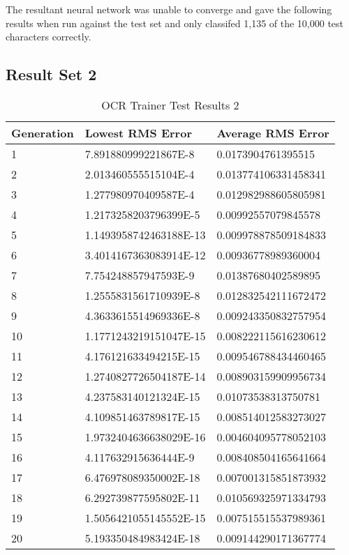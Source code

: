 The resultant neural network was unable to converge and gave the
following results when run against the test set and only classifed
1,135 of the 10,000 test characters correctly.

\subsection{Result Set 2}

\begin{center}
    \begin{longtable}{ | l | l | l |}
      \caption{OCR Trainer Test Results 2} \label{ocr2} \\
    \hline
  Generation & Lowest RMS Error & Average RMS Error \\ \hline
1 &	7.891880999221867E-8 &	0.0173904761395515 \\ \hline
2 &	2.013460555515104E-4 &	0.013774106331458341 \\ \hline
3 &	1.277980970409587E-4 &	0.012982988605805981 \\ \hline
4 &	1.2173258203796399E-5 &	0.00992557079845578 \\ \hline
5 &	1.1493958742463188E-13 &	0.009978878509184833 \\ \hline
6 &	3.4014167363083914E-12 &	0.00936778989360004 \\ \hline
7 &	7.754248857947593E-9 &	0.01387680402589895 \\ \hline
8 &	1.2555831561710939E-8 &	0.012832542111672472 \\ \hline
9 &	4.3633615514969336E-8 &	0.009243350832757954 \\ \hline
10 &	1.1771243219151047E-15 &	0.008222115616230612 \\ \hline
11 &	4.176121633494215E-15 &	0.009546788434460465 \\ \hline
12 &	1.2740827726504187E-14 &	0.008903159909956734 \\ \hline
13 &	4.237583140121324E-15 &	0.01073538313750781 \\ \hline
14 &	4.109851463789817E-15 &	0.008514012583273027 \\ \hline
15 &	1.9732404636638029E-16 &	0.004604095778052103 \\ \hline
16 &	4.117632915636444E-9 &	0.008408504165641664 \\ \hline
17 &	6.476978089350002E-18 &	0.007001315851873932 \\ \hline
18 &	6.292739877595802E-11 &	0.010569325971334793 \\ \hline
19 &	1.5056421055145552E-15 &	0.007515515537989361 \\ \hline
20 &	5.193350484983424E-18 &	0.009144290171367774 \\ \hline
\end{longtable}
\end{center}

